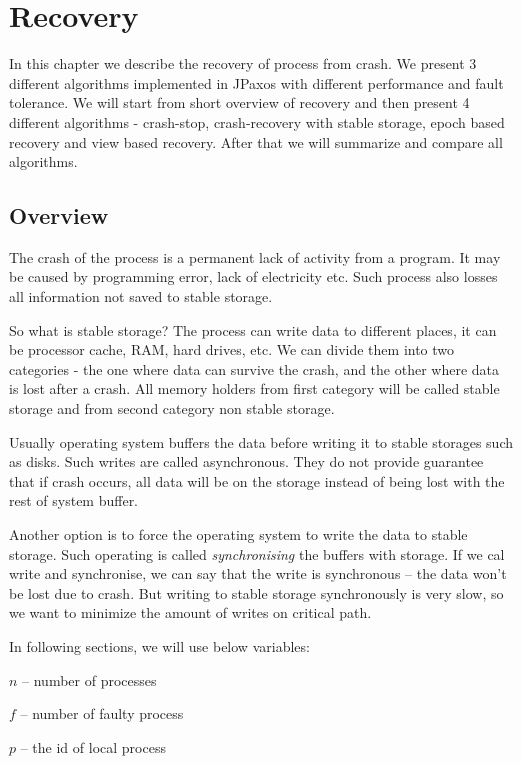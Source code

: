 \chapter{Recovery}

In this chapter we describe the recovery of process from crash. We present 3 different algorithms implemented in JPaxos with different performance and fault tolerance. We will start from short overview of recovery and then present 4 different algorithms - crash-stop, crash-recovery with stable storage, epoch based recovery and view based recovery. After that we will summarize and compare all algorithms.

\section{Overview}

The crash of the process is a permanent lack of activity from a program. It may be caused by programming error, lack of electricity etc. Such process also losses all information not saved to stable storage.

So what is stable storage? The process can write data to different places, it can be processor cache, RAM, hard drives, etc. We can divide them into two categories - the one where data can survive the crash, and the other where data is lost after a crash. All memory holders from first category will be called stable storage and from second category non stable storage.

Usually operating system buffers the data before writing it to stable storages such as disks. Such writes are called asynchronous. They do not provide guarantee that if crash occurs, all data will be on the storage instead of being lost with the rest of system buffer.

Another option is to force the operating system to write the data to stable storage. Such operating is called \emph{synchronising} the buffers with storage. If we cal write and synchronise, we can say that the write is synchronous -- the data won't be lost due to crash. But writing to stable storage synchronously is very slow, so we want to minimize the amount of writes on critical path.

In following sections, we will use below variables: 
\begin{tightList}
  \item[$n$] -- number of processes
  \item[$f$] -- number of faulty process
  \item[$p$] -- the id of local process
\end{tightList}

